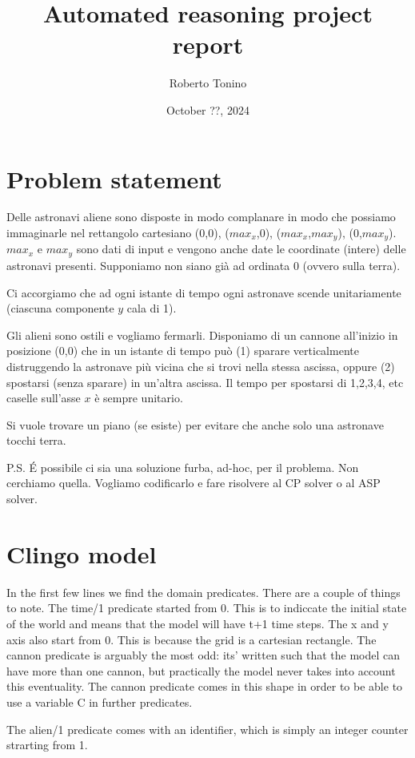 \documentclass[11pt]{article}
\title{Automated reasoning project report}
\author{Roberto Tonino}
\date{October ??, 2024}
\begin{document}
\maketitle
\pagebreak


\section{Problem statement}

Delle astronavi aliene sono disposte in modo complanare in modo che possiamo immaginarle nel rettangolo cartesiano (0,0), ($max_x$,0), ($max_x$,$max_y$), (0,$max_y$).
$max_x$ e $max_y$ sono dati di input e vengono anche date le coordinate (intere) delle astronavi presenti. Supponiamo non siano già ad ordinata 0 (ovvero sulla terra).

Ci accorgiamo che ad ogni istante di tempo ogni astronave scende unitariamente (ciascuna componente $y$ cala di 1).

Gli alieni sono ostili e vogliamo fermarli.
Disponiamo di un cannone all'inizio in posizione (0,0) che in un istante di tempo può (1) sparare verticalmente distruggendo la astronave più vicina che si trovi nella stessa ascissa, oppure (2) spostarsi (senza sparare) in un'altra ascissa.
Il tempo per spostarsi di 1,2,3,4, etc caselle sull'asse $x$ è sempre unitario.

Si vuole trovare un piano (se esiste) per evitare che anche solo una astronave tocchi terra.

P.S. \'E possibile ci sia una soluzione furba, ad-hoc, per il problema.
Non cerchiamo quella.
Vogliamo codificarlo e fare risolvere al CP solver o al ASP solver.

\section{Clingo model}

In the first few lines we find the domain predicates.
There are a couple of things to note.
The time/1 predicate started from 0.
This is to indiccate the initial state of the world and means that the model will have t+1 time steps.
The x and y axis also start from 0.
This is because the grid is a cartesian rectangle.
The cannon predicate is arguably the most odd: its' written such that the model can have more than one cannon, but practically the model never takes into account this eventuality.
The cannon predicate comes in this shape in order to be able to use a variable C in further predicates.

The alien/1 predicate comes with an identifier, which is simply an integer counter strarting from 1.
\end{document}

